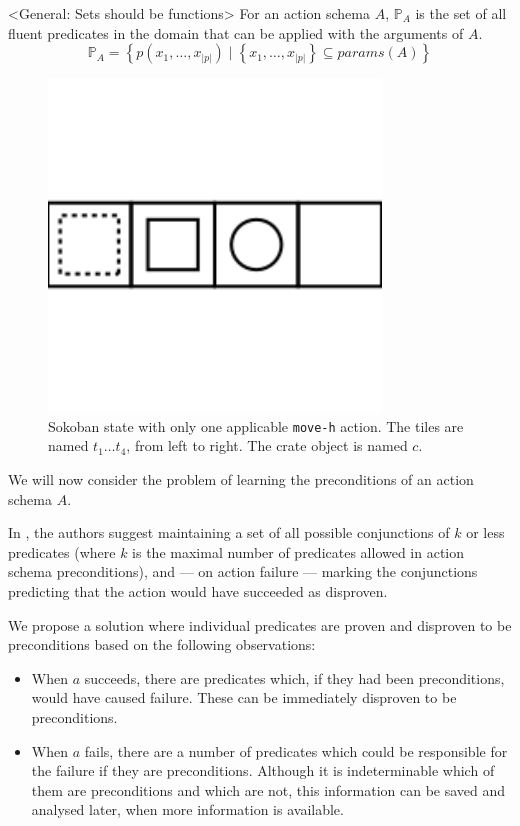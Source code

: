 \documentclass[../Master.tex]{subfiles}
\begin{document}
<General: Sets should be functions>
For an action schema $A$, $\mathbb{P}_A$ is the set of all fluent predicates in the domain that can be applied with the arguments of $A$.
\[
    \mathbb{P}_A = \left\{
        p \left( x_1, \dots, x_{|p|} \right)
        \; | \; \left\{ x_1, \dots, x_{|p|} \right\} \subseteq params(A)
    \right\}
\]

\begin{figure}
    \centering
    \includegraphics[scale=0.7]{../Graphics/sokoSmall}
    \caption{\label{fig:sokoSmall} Sokoban state with only one applicable \texttt{move-h} action. The tiles are named $t_1 \dots t_4$, from left to right. The crate object is named $c$.}
\end{figure}

We will now consider the problem of learning the preconditions of an action schema $A$.

In \cite{Walsh2008}, the authors suggest maintaining a set of all possible conjunctions of $k$ or less predicates (where $k$ is the maximal number of predicates allowed in action schema preconditions), and --- on action failure --- marking the conjunctions predicting that the action would have succeeded as disproven.

We propose a solution where individual predicates are proven and disproven to be preconditions based on the following observations:
\begin{itemize}
    \item When $a$ succeeds, there are predicates which, if they had been preconditions, would have caused failure. These can be immediately disproven to be preconditions.
    \item When $a$ fails, there are a number of predicates which could be responsible for the failure if they are preconditions. Although it is indeterminable which of them are preconditions and which are not, this information can be saved and analysed later, when more information is available.
\end{itemize}
\end{document}
